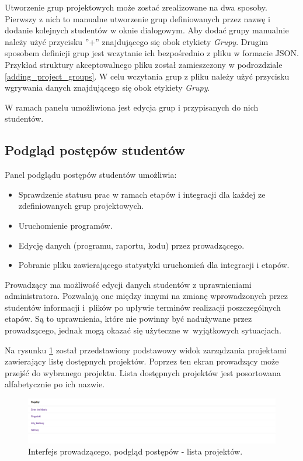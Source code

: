 Utworzenie grup projektowych może zostać zrealizowane na dwa sposoby.
Pierwszy z nich to manualne utworzenie grup definiowanych przez nazwę i dodanie kolejnych studentów w oknie dialogowym.
Aby dodać grupy manualnie należy użyć przycisku ”+” znajdującego się obok etykiety \textit{Grupy}.
Drugim sposobem definicji grup jest wczytanie ich bezpośrednio z pliku w formacie JSON.
Przykład struktury akceptowalnego pliku został zamieszczony w podrozdziale \ref{adding_project_groups}.
W celu wczytania grup z pliku należy użyć przycisku wgrywania danych znajdującego się obok etykiety \textit{Grupy}.

W ramach panelu umożliwiona jest edycja grup i przypisanych do nich studentów.

\subsection{Podgląd postępów studentów}
\label{lecturer_preview}

Panel podglądu postępów studentów umożliwia:
\begin {itemize}
    \item Sprawdzenie statusu prac w ramach etapów i integracji dla każdej ze zdefiniowanych grup projektowych.
    \item Uruchomienie programów.
    \item Edycję danych (programu, raportu, kodu) przez prowadzącego.
    \item Pobranie pliku zawierającego statystyki uruchomień dla integracji i etapów.
\end {itemize}

Prowadzący ma możliwość edycji danych studentów z uprawnieniami administratora.
Pozwalają one między innymi na zmianę wprowadzonych przez studentów informacji i~plików po upływie terminów realizacji poszczególnych etapów.
Są to uprawnienia, które nie powinny być nadużywane przez prowadzącego, jednak mogą okazać się użyteczne w~wyjątkowych sytuacjach.

Na rysunku \ref{fig:lecturer_preview_projects_list} został przedstawiony podstawowy widok zarządzania projektami zawierający listę dostępnych projektów.
Poprzez ten ekran prowadzący może przejść do wybranego projektu.
Lista dostępnych projektów jest posortowana alfabetycznie po ich nazwie.

\begin{figure}[h]
    \centering
    \includegraphics[width = 13cm]{chapter04/lecturer_preview_projects_list.png}
    \caption{Interfejs prowadzącego, podgląd postępów - lista projektów.}
    \label{fig:lecturer_preview_projects_list}
\end{figure}


